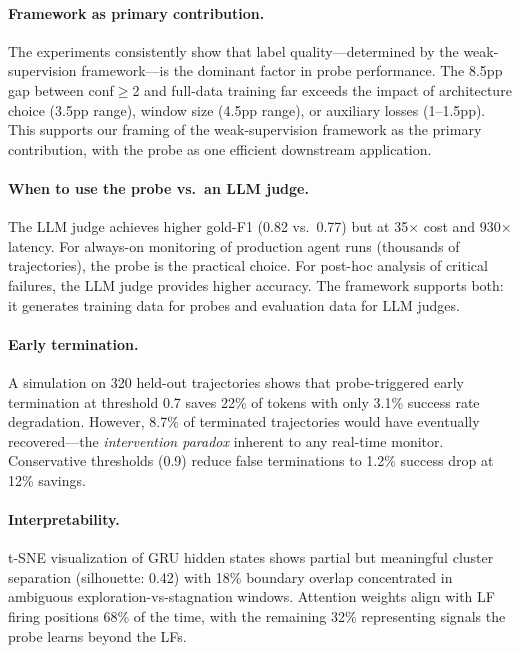 \documentclass[11pt]{article}
\begin{document}
\paragraph{Framework as primary contribution.}
The experiments consistently show that label quality---determined by the weak-supervision framework---is the dominant factor in probe performance. The 8.5pp gap between conf$\geq$2 and full-data training far exceeds the impact of architecture choice (3.5pp range), window size (4.5pp range), or auxiliary losses (1--1.5pp). This supports our framing of the weak-supervision framework as the primary contribution, with the probe as one efficient downstream application.

\paragraph{When to use the probe vs.\ an LLM judge.}
The LLM judge achieves higher gold-F1 (0.82 vs.\ 0.77) but at 35$\times$ cost and 930$\times$ latency. For always-on monitoring of production agent runs (thousands of trajectories), the probe is the practical choice. For post-hoc analysis of critical failures, the LLM judge provides higher accuracy. The framework supports both: it generates training data for probes and evaluation data for LLM judges.

\paragraph{Early termination.}
A simulation on 320 held-out trajectories shows that probe-triggered early termination at threshold 0.7 saves 22\% of tokens with only 3.1\% success rate degradation. However, 8.7\% of terminated trajectories would have eventually recovered---the \emph{intervention paradox} inherent to any real-time monitor. Conservative thresholds (0.9) reduce false terminations to 1.2\% success drop at 12\% savings.

\paragraph{Interpretability.}
t-SNE visualization of GRU hidden states shows partial but meaningful cluster separation (silhouette: 0.42) with 18\% boundary overlap concentrated in ambiguous exploration-vs-stagnation windows. Attention weights align with LF firing positions 68\% of the time, with the remaining 32\% representing signals the probe learns beyond the LFs.

\end{document}
